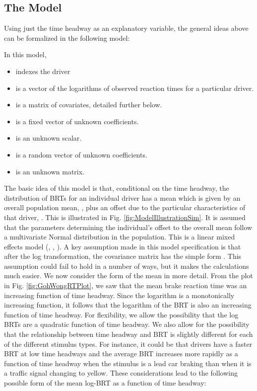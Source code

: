 \documentclass[conference]{IEEEtran}
\begin{document}
\subsection{The Model}

Using just the time headway as an explanatory variable, the general ideas above can be formalized in the following model:

In this model,
\begin{itemize}
	\item  indexes the driver
	\item  is a vector of the logarithms of observed reaction times for a particular driver.
	\item  is a matrix of covariates, detailed further below.
	\item  is a fixed vector of unknown coefficients.
	\item  is an unknown scalar.
	\item  is a random vector of unknown coefficients.
	\item  is an unknown matrix.
\end{itemize}
The basic idea of this model is that, conditional on the time headway, the distribution of BRTs for an individual driver has a mean which is given by an overall population mean, , plus an offset due to the particular characteristics of that driver, .  This is illustrated in Fig. \ref{fig:ModelIllustrationSim}.  It is assumed that the parameters  determining the individual's offset to the overall mean follow a multivariate Normal distribution in the population.  This is a linear mixed effects model
(\cite{McCullochetal:GLMM}, \cite{Searleetal:VC}, \cite{RavishankerDey:LMT}).
A key assumption made in this model specification is that after the log transformation, the covariance matrix  has the simple form .  This assumption could fail to hold in a number of ways, but it makes the calculations much easier.
We now consider the form of the mean  in more detail.  From the plot in Fig. \ref{fig:GohWongRTPlot}, we saw that the mean brake reaction time was an increasing function of time headway.  Since the logarithm is a monotonically increasing function, it follows that the logarithm of the BRT is also an increasing function of time headway.  For flexibility, we allow the possibility that the log BRTs are a quadratic function of time headway.  We also allow for the possibility that the relationship between time headway and BRT is slightly different for each of the different stimulus types.  For instance, it could be that drivers have a faster BRT at low time headways and the average BRT increases more rapidly as a function of time headway when the stimulus is a lead car braking than when it is a traffic signal changing to yellow.  These considerations lead to the following possible form of the mean log-BRT as a function of time headway:
\end{document}
